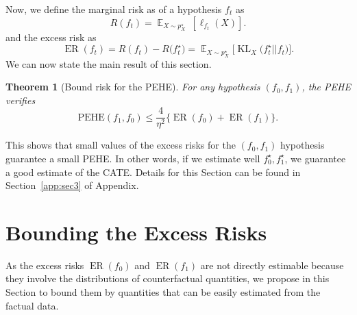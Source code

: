 \documentclass[12pt]{article}
\theoremstyle{plain}
\newtheorem{theorem}{Theorem}[section]
\theoremstyle{definition}
\theoremstyle{remark}
\DeclareMathOperator{\E}{\mathbb{E}}
\DeclareMathOperator{\KL}{\text{KL}}
\DeclareMathOperator{\ER}{\text{ER}}
\begin{document}
Now, we define the marginal risk as  of a hypothesis $f_t$ as
\begin{equation*}
    R(f_t) =\E_{X \sim p^\star_X} \ [ \ell _{f_t}( X)].
\end{equation*} and the excess risk as
\begin{equation}
\label{erdef}
\ER( f _{t})=R( f _{t}) -R\big( f^{\star}_{t}\big) =\E_{X\sim p^\star_X}\big[ \KL_{X}\big( f ^{\star}_{t} ||f _{t}\big)\big].
\end{equation}
We can now state the main result of this section.
\begin{theorem} [Bound risk for the PEHE]
\label{theo:ctrlpehe}
For any hypothesis $(f_{0},f_{1})$, the PEHE verifies
\begin{equation} \label{eqn:ctrlpehe}
         \text{PEHE}(f_1,f_0) \leq  \frac{4}{\eta^2 } \{\ER( f _{0}) + \ER( f _{1})\}.
\end{equation}
\end{theorem}
This shows that small values of the excess risks for the $(f_0,f_1)$ hypothesis guarantee a small PEHE. In other words, if we estimate well $f^\star_0,f^\star_1$, we guarantee a good estimate of the CATE.
Details for this Section can be found in Section~\ref{app:sec3} of Appendix.

\section{Bounding the Excess Risks}
\label{sec:bounds}




As the excess risks  $\ER(f_0)$ and $\ER(f_1)$ are not directly estimable because they involve the distributions of  counterfactual quantities, we propose in this Section to bound them by quantities that can be easily estimated from the factual data.
\end{document}

